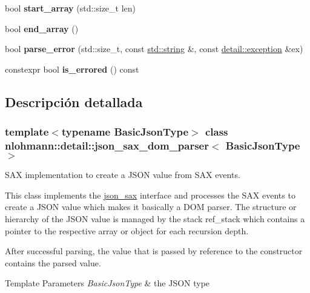 \begin{DoxyCompactItemize}
bool {\bfseries start\+\_\+array} (std\+::size\+\_\+t len)
\item 
\mbox{\label{classnlohmann_1_1detail_1_1json__sax__dom__parser_af7cb5e5fe06ea908b0ce4ed762919759}} 
bool {\bfseries end\+\_\+array} ()
\item 
\mbox{\label{classnlohmann_1_1detail_1_1json__sax__dom__parser_a7d3bf1f361ebb817c694ba45b3814fa6}} 
bool {\bfseries parse\+\_\+error} (std\+::size\+\_\+t, const \mbox{\hyperlink{namespacenlohmann_1_1detail_a1ed8fc6239da25abcaf681d30ace4985ab45cffe084dd3d20d928bee85e7b0f21}{std\+::string}} \&, const \mbox{\hyperlink{classnlohmann_1_1detail_1_1exception}{detail\+::exception}} \&ex)
\item 
\mbox{\label{classnlohmann_1_1detail_1_1json__sax__dom__parser_ad1b9f3681fadbbb2e0127f5c8a99c662}} 
constexpr bool {\bfseries is\+\_\+errored} () const
\end{DoxyCompactItemize}


\subsection{Descripción detallada}
\subsubsection*{template$<$typename Basic\+Json\+Type$>$\newline
class nlohmann\+::detail\+::json\+\_\+sax\+\_\+dom\+\_\+parser$<$ Basic\+Json\+Type $>$}

S\+AX implementation to create a J\+S\+ON value from S\+AX events. 

This class implements the \mbox{\hyperlink{structnlohmann_1_1json__sax}{json\+\_\+sax}} interface and processes the S\+AX events to create a J\+S\+ON value which makes it basically a D\+OM parser. The structure or hierarchy of the J\+S\+ON value is managed by the stack {\ttfamily ref\+\_\+stack} which contains a pointer to the respective array or object for each recursion depth.

After successful parsing, the value that is passed by reference to the constructor contains the parsed value.


\begin{DoxyTemplParams}{Template Parameters}
{\em Basic\+Json\+Type} & the J\+S\+ON type \\
\hline
\end{DoxyTemplParams}


